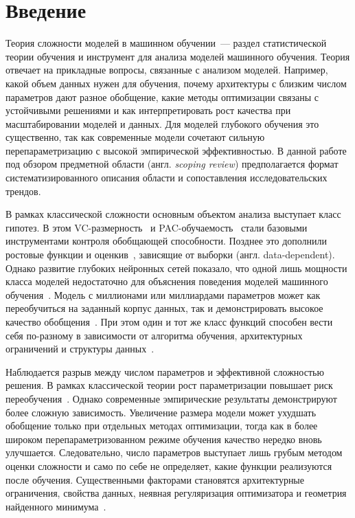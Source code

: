 \documentclass[russian]{intsys}
\begin{document}
\section{Введение}

Теория сложности моделей в машинном обучении~--- раздел статистической теории обучения и инструмент для анализа моделей машинного обучения.
Теория отвечает на прикладные вопросы, связанные с анализом моделей. Например, какой объем данных нужен для обучения, почему архитектуры с близким числом параметров дают разное обобщение, какие методы оптимизации связаны с устойчивыми решениями и как интерпретировать рост качества при масштабировании моделей и данных.
Для моделей глубокого обучения это существенно, так как современные модели сочетают сильную перепараметризацию с высокой эмпирической эффективностью.
В данной работе под обзором предметной области (англ. \textit{scoping review}) предполагается формат систематизированного описания области и сопоставления исследовательских трендов.

В рамках классической сложности основным объектом анализа выступает класс гипотез.
В этом VC-размерность~\cite{vapnik1971uniform} и PAC-обучаемость~\cite{valiant1984theory} стали базовыми инструментами контроля обобщающей способности. Позднее это дополнили ростовые функции и оценкив~\cite{vapnik1998statistical,bartlett2002rademacher}, зависящие от выборки (англ. data-dependent).
Однако развитие глубоких нейронных сетей показало, что одной лишь мощности класса моделей недостаточно для объяснения поведения моделей машинного обучения~\cite{zhang2021rethinking}.
Модель с миллионами или миллиардами параметров может как переобучиться на заданный корпус данных, так и демонстрировать высокое качество обобщения~\cite{belkin2019reconciling}.
При этом один и тот же класс функций способен вести себя по-разному в зависимости от алгоритма обучения, архитектурных ограничений и структуры данных~\cite{zhang2021rethinking,belkin2019reconciling}.

Наблюдается разрыв между числом параметров и эффективной сложностью решения.
В рамках классической теории рост параметризации повышает риск переобучения~\cite{valiant1984theory}.
Однако современные эмпирические результаты демонстрируют более сложную зависимость.
Увеличение размера модели может ухудшать обобщение только при отдельных методах оптимизации, тогда как в более широком перепараметризованном режиме обучения качество нередко вновь улучшается.
Следовательно, число параметров выступает лишь грубым методом оценки сложности и само по себе не определяет, какие функции реализуются после обучения.
Существенными факторами становятся архитектурные ограничения, свойства данных, неявная регуляризация оптимизатора и геометрия найденного минимума~\cite{li2018visualizing}.
\end{document}
